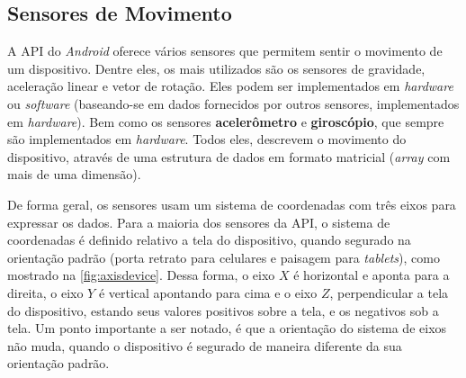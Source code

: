 \subsection{Sensores de Movimento}
\label{subsec:motionsensors}

A API do \textit{Android} oferece vários sensores que permitem sentir o movimento de um dispositivo. Dentre eles, os mais utilizados são os sensores de gravidade, aceleração linear e vetor de rotação. Eles podem ser implementados em \textit{hardware} ou \textit{software} (baseando-se em dados fornecidos por outros sensores, implementados em \textit{hardware}). Bem como os sensores \textbf{acelerômetro} e \textbf{giroscópio}, que sempre são implementados em \textit{hardware}. Todos eles, descrevem o movimento do dispositivo, através de uma estrutura de dados em formato matricial (\textit{array} com mais de uma dimensão).\par

De forma geral, os sensores usam um sistema de coordenadas com três eixos para expressar os dados. Para a maioria dos sensores da API, o sistema de coordenadas é definido relativo a tela do dispositivo, quando segurado na orientação padrão (porta retrato para celulares e paisagem para \textit{tablets}), como mostrado na \autoref{fig:axisdevice}. Dessa forma, o eixo $X$ é horizontal e aponta para a direita, o eixo $Y$ é vertical apontando para cima e o eixo $Z$, perpendicular a tela do dispositivo, estando seus valores positivos sobre a tela, e os negativos sob a tela. Um ponto importante a ser notado, é que a orientação do sistema de eixos não muda, quando o dispositivo é segurado de maneira diferente da sua orientação padrão.\par


